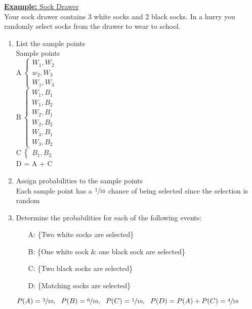 \documentclass[a4paper]{article}
\let\bf\textbf
\begin{document}
\begin{shaded}
    \underline{\bf{Example:} Sock Drawer}
    \vspace{2mm}\\
    Your sock drawer contains 3 white socks and 2 black socks. In a hurry you randomly select socks from the drawer to wear to school.
    \begin{enumerate}
        \item List the sample points\\
        Sample points\\
        A$\
        \begin{cases}
            W_1,W_2\\
            w_2,W_3\\
            W_1,W_3
        \end{cases}$
        \vspace{1mm}\\
        B$\
        \begin{cases}
            W_1,B_1\\
            W_1,B_2\\
            W_2,B_1\\
            W_2,B_2\\
            W_3,B_1\\
            W_3,B_2
        \end{cases}$
        \vspace{1mm}\\
        C$\
        \begin{cases}
            B_1,B_2
        \end{cases}$
        \vspace{1mm}\\
        D = A + C
        \item Assign probabilities to the sample points\\
        Each sample point has a $\sfrac{1}{10}$ chance of being selected since the selection is random
        \item Determine the probabilities for each of the following events:
        \begin{itemize}
            \item[A:] \{Two white socks are selected\}
            \item[B:] \{One white sock \& one black sock are selected\}
            \item[C:] \{Two black socks are selected\}
            \item[D:] \{Matching socks are selected\} 
        \end{itemize}
        $P(A) = \sfrac{3}{10},\ \ P(B) = \sfrac{6}{10},\ \ P(C) = \sfrac{1}{10},\ \ P(D) = P(A) + P(C) = \sfrac{4}{10}$
    \end{enumerate}
\end{shaded}
\end{document}
